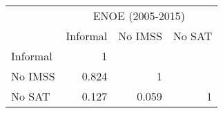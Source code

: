 \begin{tabular}{l|rrr}
\toprule
\multicolumn{1}{r}{} & \multicolumn{3}{c}{ENOE (2005-2015)} \\
\cmidrule{2-4}      & \multicolumn{1}{l}{Informal} & \multicolumn{1}{l}{No IMSS} & \multicolumn{1}{l}{No SAT} \\
\midrule
\midrule
Informal & 1     &       &  \\
No IMSS & 0.824 & 1     &  \\
No SAT & 0.127 & 0.059 & 1 \\
\bottomrule
\bottomrule
\end{tabular}%
